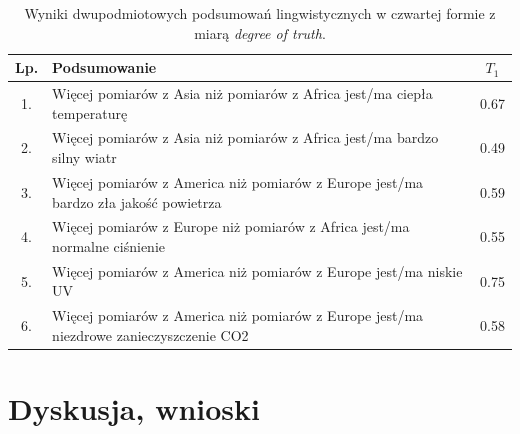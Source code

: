 \documentclass{article}
\begin{document}
\begin{table}[H]
\begin{center}
\normalsize %
\begin{tabular}{|c|p{10cm}|c|} %
\hline
\textbf{Lp.} & \textbf{Podsumowanie} & \textbf{\(T_1\)} \\ \hline
1. & Więcej pomiarów z Asia niż pomiarów z Africa jest/ma ciepła temperaturę & 0.67 \\\hline
2. & Więcej pomiarów z Asia niż pomiarów z Africa jest/ma bardzo silny wiatr & 0.49 \\\hline
3. & Więcej pomiarów z America niż pomiarów z Europe jest/ma bardzo zła jakość powietrza & 0.59 \\\hline
4. & Więcej pomiarów z Europe niż pomiarów z Africa jest/ma normalne ciśnienie & 0.55 \\\hline
5. & Więcej pomiarów z America niż pomiarów z Europe jest/ma niskie UV & 0.75 \\\hline
6. & Więcej pomiarów z America niż pomiarów z Europe jest/ma niezdrowe zanieczyszczenie CO2 & 0.58 \\\hline 
\end{tabular}
\caption{Wyniki dwupodmiotowych podsumowań lingwistycznych w czwartej formie z miarą \textit{degree of truth}.}
\end{center}
\end{table}

\section{Dyskusja, wnioski}
\end{document}
